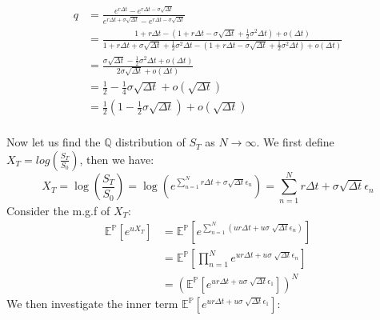 \documentclass[12pt, letterpaper]{article}
\begin{document}
\begin{align*}
  q &= \frac{e^{r\Delta t} - e^{r\Delta t - \sigma \sqrt{\Delta t}}}{e^{r\Delta t + \sigma \sqrt{\Delta t}} - e^{r\Delta t - \sigma \sqrt{\Delta t}}}\\
  &= \frac{1+r\Delta t - (1 + r \Delta t - \sigma \sqrt{\Delta t} + \frac{1}{2} \sigma^2\Delta t) + o(\Delta t)}
    {1+r\Delta t + \sigma \sqrt{\Delta t} + \frac{1}{2} \sigma^2\Delta t - (1 + r \Delta t - \sigma \sqrt{\Delta t} + \frac{1}{2} \sigma^2\Delta t) + o(\Delta t)} \\
  &= \frac{\sigma \sqrt{\Delta t} - \frac{1}{2} \sigma^2\Delta t + o(\Delta t)}{2\sigma\sqrt{\Delta t} + o(\Delta t)}\\
  &= \frac{1}{2} - \frac{1}{4}\sigma\sqrt{\Delta t} + o(\sqrt{\Delta t}) \\
  &= \frac{1}{2}(1 - \frac{1}{2}\sigma\sqrt{\Delta t}) + o(\sqrt{\Delta t})
\end{align*}
\\
Now let us find the $\mathbb{Q}$ distribution of $S_T$ as $N \rightarrow \infty$. We first define $X_T = log(\frac{S_T}{S_0})$, then we have: 
\[X_T = \log(\frac{S_T}{S_0}) = \log(e^{\sum_{n=1}^N r\Delta t + \sigma \sqrt{\Delta t} \epsilon_n}) = \sum_{n=1}^N r\Delta t + \sigma \sqrt{\Delta t} \epsilon_n \]
Consider the m.g.f of $X_T$:
\begin{align*}
  \mathbb{E}^\mathbb{P}[e^{u X_T}] & =  \mathbb{E}^\mathbb{P}[e^{\sum_{n=1}^N (u r\Delta t+u\sigma \sqrt[]{\Delta t} \epsilon_n)}] \\
  & = \mathbb{E}^\mathbb{P} [\prod_{n=1}^N e^{u r\Delta t+u\sigma \sqrt[]{\Delta t} \epsilon_n}] \\
  & = (\mathbb{E}^\mathbb{P} [e^{u r\Delta t+u\sigma \sqrt[]{\Delta t} \epsilon_1}])^N \tag*{as $\epsilon_n$ is i.i.d}
\end{align*}
We then investigate the inner term $\mathbb{E}^\mathbb{P} [e^{u r\Delta t+ u\sigma \sqrt[]{\Delta t} \epsilon_1}]$:
\end{document}
